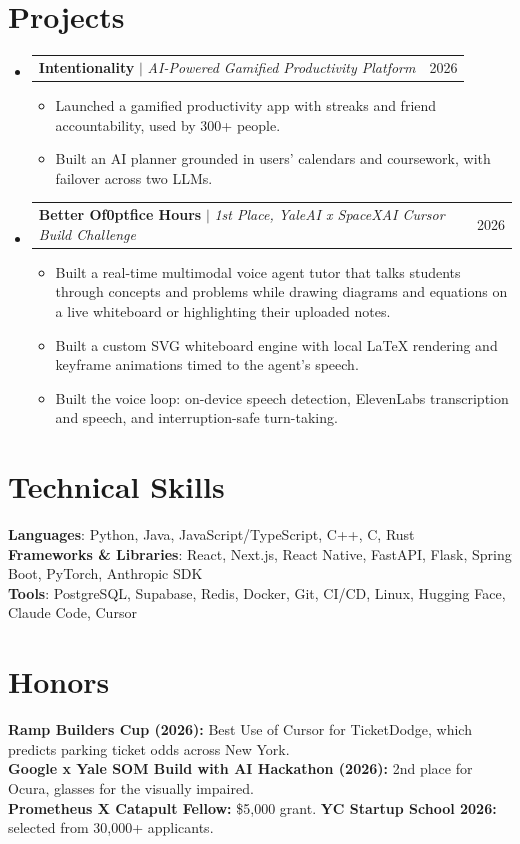 \documentclass[letterpaper,10pt]{article}
\makeatletter
\newcommand{\resumeItem}[1]{\item\small{{#1 \vspace{-2pt}}}}
\newcommand{\resumeProjectHeading}[2]{
    \item
    \begin{tabular*}{0.97\textwidth}{l@{\extracolsep{\fill}}r}
      \small#1 & #2 \\
    \end{tabular*}\vspace{-7pt}
}
\newcommand{\resumeSubHeadingListStart}{\begin{itemize}[leftmargin=0.15in, label={}]}
\newcommand{\resumeSubHeadingListEnd}{\end{itemize}}
\newcommand{\resumeItemListStart}{\begin{itemize}}
\newcommand{\resumeItemListEnd}{\end{itemize}\vspace{-5pt}}
\makeatother
\begin{document}
\section{Projects}
    \resumeSubHeadingListStart
      \resumeProjectHeading
          {\textbf{Intentionality} $|$ \emph{AI-Powered Gamified Productivity Platform}}{2026}
          \resumeItemListStart
            \resumeItem{Launched a gamified productivity app with streaks and friend accountability, used by 300+ people.}
            \resumeItem{Built an AI planner grounded in users' calendars and coursework, with failover across two LLMs.}
          \resumeItemListEnd
      \resumeProjectHeading
          {\textbf{Better Of\kern0ptfice Hours} $|$ \emph{1st Place, YaleAI x SpaceXAI Cursor Build Challenge}}{2026}
          \resumeItemListStart
            \resumeItem{Built a real-time multimodal voice agent tutor that talks students through concepts and problems while drawing diagrams and equations on a live whiteboard or highlighting their uploaded notes.}
            \resumeItem{Built a custom SVG whiteboard engine with local LaTeX rendering and keyframe animations timed to the agent's speech.}
            \resumeItem{Built the voice loop: on-device speech detection, ElevenLabs transcription and speech, and interruption-safe turn-taking.}
          \resumeItemListEnd
    \resumeSubHeadingListEnd

\section{Technical Skills}
 \begin{itemize}[leftmargin=0.15in, label={}]
    \small{\item{
     \textbf{Languages}{: Python, Java, JavaScript/TypeScript, C++, C, Rust} \\
     \textbf{Frameworks \& Libraries}{: React, Next.js, React Native, FastAPI, Flask, Spring Boot, PyTorch, Anthropic SDK} \\
     \textbf{Tools}{: PostgreSQL, Supabase, Redis, Docker, Git, CI/CD, Linux, Hugging Face, Claude Code, Cursor}
    }}
 \end{itemize}

\section{Honors}
 \begin{itemize}[leftmargin=0.15in, label={}]
    \small{\item{
     \textbf{Ramp Builders Cup (2026):} Best Use of Cursor for TicketDodge, which predicts parking ticket odds across New York. \\
     \textbf{Google x Yale SOM Build with AI Hackathon (2026):} 2nd place for Ocura, glasses for the visually impaired. \\
     \textbf{Prometheus X Catapult Fellow:} \$5,000 grant. \quad \textbf{YC Startup School 2026:} selected from 30,000+ applicants.
    }}
 \end{itemize}
\end{document}
